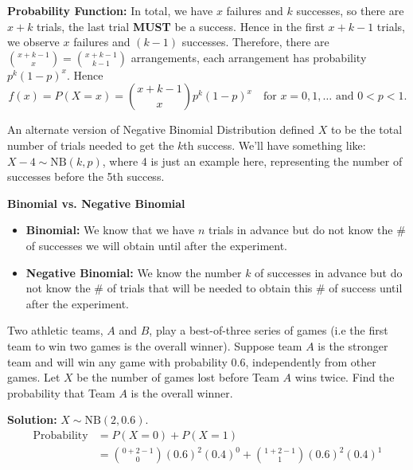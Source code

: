 \textbf{Probability Function:} In total, we have $x$ failures and $k$ successes, so there are $x+k$ trials, the last trial \textbf{MUST} be a success.
Hence in the first $x+k-1$ trials, we observe $x$ failures and $(k-1)$ successes. Therefore, there are $\binom{x+k-1}{x} = \binom{x+k-1}{k-1}$ arrangements, each arrangement has probability $p^k(1-p)^x$.
Hence \[f(x) = P(X=x) = \binom{x+k-1}{x}p^k(1-p)^x \quad \text{for $x = 0,1,\ldots$ and $0 < p < 1$}.\]

\begin{note}
    An alternate version of Negative Binomial Distribution defined $X$ to be the total number of trials needed to get the $k$th success. We'll have something like: $X-4 \sim \text{NB}(k,p)$, 
    where 4 is just an example here, representing the number of successes before the 5th success.
\end{note}

\textbf{Binomial vs. Negative Binomial}
\begin{itemize}
    \item \textbf{Binomial:} We know that we have $n$ trials in advance but do not
    know the \# of successes we will obtain until after the experiment.
    \item \textbf{Negative Binomial:} We know the number $k$ of successes in advance but do
    not know the \# of trials that will be needed to obtain this \# of success until after the experiment.
\end{itemize}


\pagebreak

\begin{example}
    Two athletic teams, $A$ and $B$, play a best-of-three series of games (i.e the first team to win two games is the overall winner). Suppose team $A$ is the
    stronger team and will win any game with probability 0.6, independently from other games. Let $X$ be the number of games lost before Team $A$ wins twice.
    Find the probability that Team $A$ is the overall winner.

    \textbf{Solution:} $X \sim \text{NB}(2, 0.6)$. \vspace{-5mm}
    \begin{align*}
        \text{Probability} &= P(X = 0) + P(X = 1) \\
        &= \binom{0+2-1}{0}(0.6)^2(0.4)^0 + \binom{1+2-1}{1}(0.6)^2(0.4)^1
    \end{align*}
\end{example}

